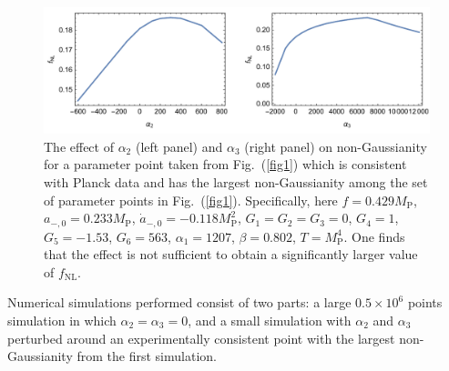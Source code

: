 \documentclass[a4paper,11pt]{article}
\begin{document}
  \begin{figure}
  	\centering
  	\includegraphics[width=1.0\textwidth]{figs/fig3.pdf}
  	\caption{The effect of $\alpha_2$ (left panel) and $\alpha_3$ (right panel) on non-Gaussianity for a parameter point 
	taken from Fig.~(\ref{fig1}) which is consistent with 
	Planck data and has the  largest non-Gaussianity among the set of parameter points 
  in Fig.~(\ref{fig1}). Specifically, here $f = 0.429 M_\text{P}$, $a_{-, 0} = 0.233 M_\text{P}$, $\dot a_{-, 0} = -0.118 M_\text{P}^2$, $G_1 = G_2 = G_3 = 0$, $G_4 = 1$, $G_5 = -1.53$, $G_6 = 563$, $\alpha_1 = 1207$, $\beta = 0.802$, $T = M_\text{P}^4$. One 
	finds that 
	 the effect is not sufficient to obtain a significantly larger value of $f_\text{NL}$.}
  	\label{fig3}
  \end{figure}

Numerical simulations performed consist of two parts: a large $0.5 \times 10^6$ points simulation in which $\alpha_2 = \alpha_3 = 0$, and a small simulation with $\alpha_2$ and $\alpha_3$ perturbed around an experimentally consistent point with the largest non-Gaussianity from the first simulation.

  
  
\end{document}
